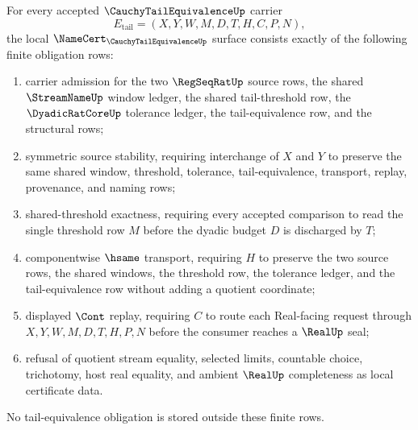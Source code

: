 \begin{theorem}
\label{thm:cauchy-tail-equivalence-namecert-obligations}
For every accepted $\CauchyTailEquivalenceUp$ carrier
$$
E_{\mathrm{tail}}=(X,Y,W,M,D,T,H,C,P,N),
$$
the local $\NameCert_{\CauchyTailEquivalenceUp}$ surface consists exactly of the following finite obligation rows:
\begin{enumerate}
\item carrier admission for the two $\RegSeqRatUp$ source rows, the shared $\StreamNameUp$ window ledger, the shared tail-threshold row, the $\DyadicRatCoreUp$ tolerance ledger, the tail-equivalence row, and the structural rows;
\item symmetric source stability, requiring interchange of $X$ and $Y$ to preserve the same shared window, threshold, tolerance, tail-equivalence, transport, replay, provenance, and naming rows;
\item shared-threshold exactness, requiring every accepted comparison to read the single threshold row $M$ before the dyadic budget $D$ is discharged by $T$;
\item componentwise $\hsame$ transport, requiring $H$ to preserve the two source rows, the shared windows, the threshold row, the tolerance ledger, and the tail-equivalence row without adding a quotient coordinate;
\item displayed $\Cont$ replay, requiring $C$ to route each Real-facing request through $X,Y,W,M,D,T,H,P,N$ before the consumer reaches a $\RealUp$ seal;
\item refusal of quotient stream equality, selected limits, countable choice, trichotomy, host real equality, and ambient $\RealUp$ completeness as local certificate data.
\end{enumerate}
No tail-equivalence obligation is stored outside these finite rows.
\end{theorem}

